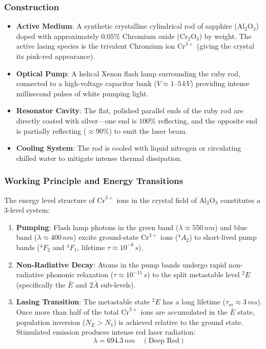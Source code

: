 \subsubsection{Construction}
\begin{itemize}
    \item \textbf{Active Medium}: A synthetic crystalline cylindrical rod of sapphire ($\text{Al}_2\text{O}_3$) doped with approximately $0.05\%$ Chromium oxide ($\text{Cr}_2\text{O}_3$) by weight. The active lasing species is the trivalent Chromium ion $\text{Cr}^{3+}$ (giving the crystal its pink-red appearance).
    \item \textbf{Optical Pump}: A helical Xenon flash lamp surrounding the ruby rod, connected to a high-voltage capacitor bank ($V \approx 1\text{--}5\,\si{kV}$) providing intense millisecond pulses of white pumping light.
    \item \textbf{Resonator Cavity}: The flat, polished parallel ends of the ruby rod are directly coated with silver—one end is $100\%$ reflecting, and the opposite end is partially reflecting ($\approx 90\%$) to emit the laser beam.
    \item \textbf{Cooling System}: The rod is cooled with liquid nitrogen or circulating chilled water to mitigate intense thermal dissipation.
\end{itemize}

\subsubsection{Working Principle and Energy Transitions}
The energy level structure of $\text{Cr}^{3+}$ ions in the crystal field of $\text{Al}_2\text{O}_3$ constitutes a 3-level system:
\begin{enumerate}
    \item \textbf{Pumping}: Flash lamp photons in the green band ($\lambda \approx 550\,\si{nm}$) and blue band ($\lambda \approx 400\,\si{nm}$) excite ground-state $\text{Cr}^{3+}$ ions ($^4A_2$) to short-lived pump bands ($^4F_2$ and $^4F_1$, lifetime $\tau \approx 10^{-8}\,\si{s}$).
    \item \textbf{Non-Radiative Decay}: Atoms in the pump bands undergo rapid non-radiative phononic relaxation ($\tau \approx 10^{-11}\,\si{s}$) to the split metastable level $^2E$ (specifically the $\bar{E}$ and $2\bar{A}$ sub-levels).
    \item \textbf{Lasing Transition}: The metastable state $^2E$ has a long lifetime ($\tau_m \approx 3\,\si{ms}$). Once more than half of the total $\text{Cr}^{3+}$ ions are accumulated in the $\bar{E}$ state, population inversion ($N_{\bar{E}} > N_1$) is achieved relative to the ground state. Stimulated emission produces intense red laser radiation:
    \begin{equation}
        \lambda = 694.3\,\si{nm} \quad (\text{Deep Red})
    \end{equation}
\end{enumerate}

